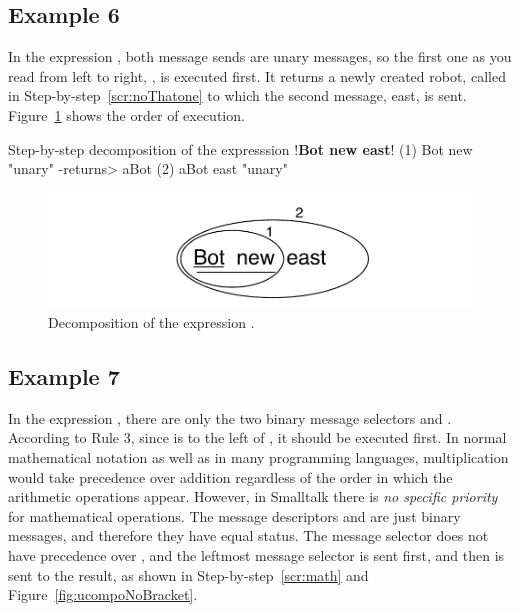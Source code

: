 \documentclass[a4paper,10pt,twoside]{book}
\begin{document}

\subsection{Example 6}

In the expression , both message sends are unary messages, so the first one as 
you read from left to right, , is executed first. It returns a newly created robot, called 
 in Step-by-step~\ref{scr:noThatone} to which the second message, east, is sent. 
Figure~\ref{fig:ucompoUn} shows  the order of execution. 


\begin{script}[noThatone]{Step-by-step decomposition of the expresssion }
!\textbf{Bot new east}!     
  (1)  Bot new                 "unary"
      -returns>  aBot
  (2)         aBot east        "unary"
\end{script}


\begin{figure}[h]
	\centerline{\includegraphics[width=\linewidth]{ucompoUn}}
	\caption{Decomposition of the expression .\label{fig:ucompoUn}}
\end{figure}


\subsection{Example 7}

In the expression , there are only the two binary message selectors \ct{+} and \ct{*}. According 
to Rule 3, since \ct{+} is to the left of \ct{*}, it should be executed first. In normal mathematical 
notation as well as in many programming languages, multiplication would take precedence 
over addition regardless of the order in which the arithmetic operations appear. However, in 
Smalltalk there is \emph{no specific priority} for mathematical operations. The message descriptors \ct{+} 
and \ct{*} are just binary messages, and therefore they have equal status. The message selector \ct{*} 
does not have precedence over \ct{+}, and the leftmost message selector \ct{+} is sent first, and then 
\ct{*} is sent to the result, as shown in Step-by-step~\ref{scr:math} and Figure~\ref{fig:ucompoNoBracket}. 
\end{document}
